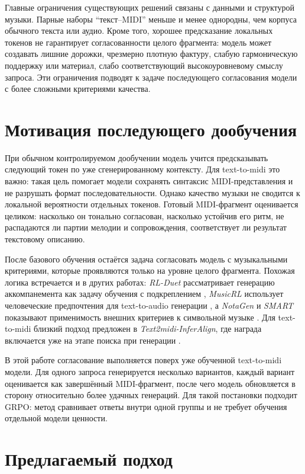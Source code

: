 \documentclass[a4paper,12pt]{extarticle}
\begin{document}
Главные ограничения существующих решений связаны с данными и структурой
музыки. Парные наборы ``текст--MIDI'' меньше и менее однородны, чем корпуса
обычного текста или аудио. Кроме того, хорошее предсказание локальных токенов
не гарантирует согласованности целого фрагмента: модель может создавать
лишние дорожки, чрезмерно плотную фактуру, слабую гармоническую поддержку
или материал, слабо соответствующий высокоуровневому смыслу запроса. Эти
ограничения подводят к задаче последующего согласования модели с более
сложными критериями качества.

\section{Мотивация последующего дообучения}
\label{sec:motivation}
При обычном контролируемом дообучении модель учится предсказывать следующий
токен по уже сгенерированному контексту. Для text-to-midi это важно: такая
цель помогает модели сохранять синтаксис MIDI-представления и не разрушать
формат последовательности. Однако качество музыки не сводится к локальной
вероятности отдельных токенов. Готовый MIDI-фрагмент оценивается целиком:
насколько он тонально согласован, насколько устойчив его ритм, не распадаются ли
партии мелодии и сопровождения, соответствует ли результат текстовому
описанию.

После базового обучения остаётся задача согласовать модель с музыкальными
критериями, которые проявляются только на уровне целого фрагмента. Похожая
логика встречается и в других работах: \textit{RL-Duet} рассматривает генерацию аккомпанемента как задачу
обучения с подкреплением \cite{rlduet2020}, \textit{MusicRL} использует
человеческие предпочтения для text-to-audio генерации \cite{musicrl2024}, а
\textit{NotaGen} и \textit{SMART} показывают применимость внешних критериев
к символьной музыке \cite{notagen2025,smart2025}. Для text-to-midi близкий
подход предложен в \textit{Text2midi-InferAlign}, где награда включается уже
на этапе поиска при генерации \cite{text2midiinferalign2025}.

В этой работе согласование выполняется поверх уже обученной text-to-midi
модели. Для одного запроса генерируется несколько вариантов, каждый вариант
оценивается как завершённый MIDI-фрагмент, после чего модель обновляется в
сторону относительно более удачных генераций. Для такой постановки подходит
GRPO: метод сравнивает ответы внутри одной группы и не требует обучения отдельной модели
ценности.


\section{Предлагаемый подход}
\label{sec:approach}
\end{document}
